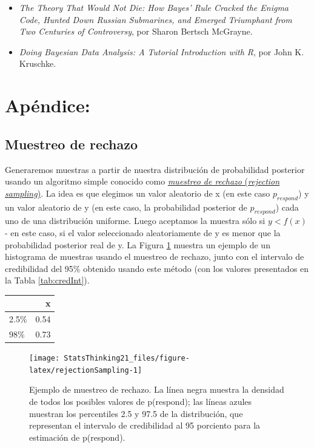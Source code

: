 \documentclass[
  12pt,
]{book}
\providecommand{\tightlist}{%
  \setlength{\itemsep}{0pt}\setlength{\parskip}{0pt}}
\begin{document}
\begin{itemize}
\tightlist
\item
  \emph{The Theory That Would Not Die: How Bayes' Rule Cracked the Enigma Code, Hunted Down Russian Submarines, and Emerged Triumphant from Two Centuries of Controversy}, por Sharon Bertsch McGrayne.
\item
  \emph{Doing Bayesian Data Analysis: A Tutorial Introduction with R}, por John K. Kruschke.
\end{itemize}

\hypertarget{apuxe9ndice-3}{%
\section{Apéndice:}\label{apuxe9ndice-3}}

\hypertarget{muestreo-de-rechazo}{%
\subsection{Muestreo de rechazo}\label{muestreo-de-rechazo}}

Generaremos muestras a partir de nuestra distribución de probabilidad posterior usando un algoritmo simple conocido como \href{https://am207.github.io/2017/wiki/rejectionsampling.html}{\emph{muestreo de rechazo} (\emph{rejection sampling})}. La idea es que elegimos un valor aleatorio de x (en este caso \(p_{respond}\)) y un valor aleatorio de y (en este caso, la probabilidad posterior de \(p_{respond}\)) cada uno de una distribución uniforme. Luego aceptamos la muestra sólo si \(y < f(x)\) - en este caso, si el valor seleccionado aleatoriamente de y es menor que la probabilidad posterior real de y. La Figura \ref{fig:rejectionSampling} muestra un ejemplo de un histograma de muestras usando el muestreo de rechazo, junto con el intervalo de credibilidad del 95\% obtenido usando este método (con los valores presentados en la Tabla \ref{tab:credInt}).

\begin{tabular}{l|r}
\hline
  & x\\
\hline
2.5\% & 0.54\\
\hline
98\% & 0.73\\
\hline
\end{tabular}

\begin{figure}
\texttt{[image: StatsThinking21\_files/figure-latex/rejectionSampling-1]} \caption{Ejemplo de muestreo de rechazo. La línea negra muestra la densidad de todos los posibles valores de p(respond); las líneas azules muestran los percentiles 2.5 y 97.5 de la distribución, que representan el intervalo de credibilidad al 95 porciento para la estimación de p(respond).}\label{fig:rejectionSampling}
\end{figure}
\end{document}

